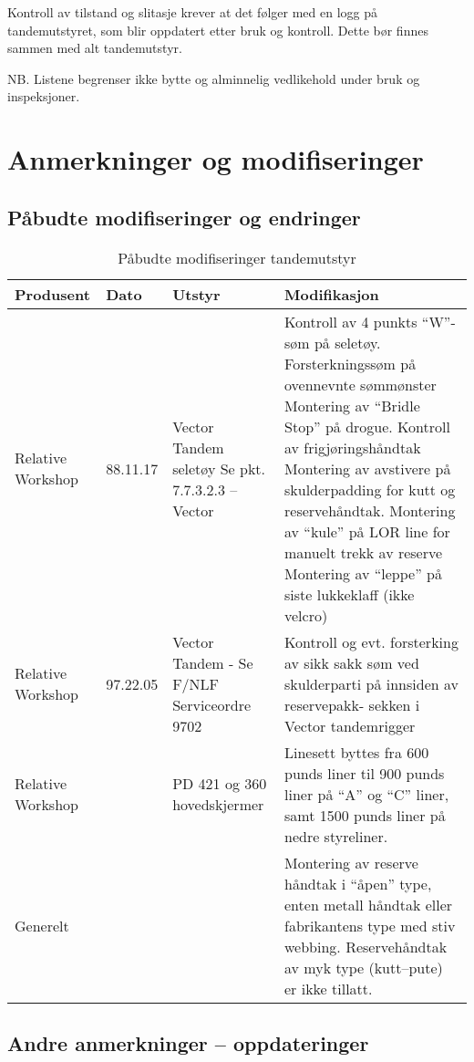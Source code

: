 Kontroll av tilstand og slitasje krever at det følger med en logg på tandemutstyret, som blir oppdatert etter bruk og kontroll. Dette bør finnes sammen med alt tandemutstyr.

NB. Listene begrenser ikke bytte og alminnelig vedlikehold under bruk og inspeksjoner.

\section{Anmerkninger og modifiseringer}
\subsection{Påbudte modifiseringer og endringer}
\begin{table}
	\caption{Påbudte modifiseringer tandemutstyr}
	\begin{tabular}{ | p{2cm} | p{1cm} | p{3cm} | p{4cm} | }
		\hline
		Produsent & Dato & Utstyr & Modifikasjon \\
		\hline
		Relative Workshop & 88.11.17 &
		Vector Tandem seletøy
		Se pkt. 7.7.3.2.3 – Vector &
		Kontroll av 4 punkts ``W''-søm på seletøy.
		Forsterkningssøm på ovennevnte sømmønster
		Montering av ``Bridle Stop'' på drogue.
		Kontroll av frigjøringshåndtak
		Montering av avstivere på skulderpadding for kutt og reservehåndtak.
		Montering av ``kule'' på LOR line for manuelt trekk av reserve
		Montering av ``leppe'' på siste lukkeklaff (ikke velcro) \\
		\hline
		Relative Workshop & 97.22.05 &
		Vector Tandem - Se F/NLF Serviceordre 9702 &
		Kontroll og evt. forsterking av sikk sakk søm ved skulderparti på innsiden av reservepakk- sekken i Vector tandemrigger \\
		\hline
		Relative Workshop & & PD 421 og 360 hovedskjermer &
		Linesett byttes fra 600 punds liner til 900 punds liner på ``A'' og ``C'' liner, samt 1500 punds liner på nedre styreliner. \\
		\hline
		Generelt & & &
		Montering av reserve håndtak i ``åpen'' type, enten metall håndtak eller fabrikantens type med stiv webbing.
		Reservehåndtak av myk type (kutt–pute) er ikke tillatt. \\
		\hline
	\end{tabular}
\end{table}

\subsection{Andre anmerkninger – oppdateringer}
